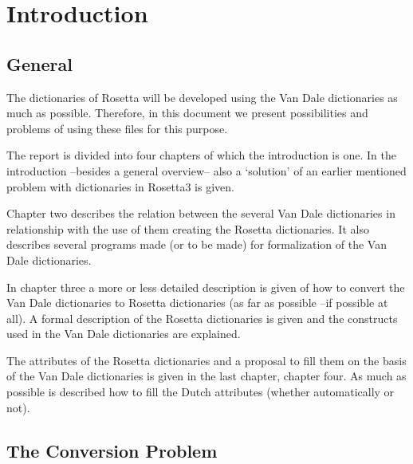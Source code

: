  

   \RosSupersedes{-}
   \MakeRosTitle
%
%
\setlength{\parskip}{2mm}
\setlength{\parindent}{0mm}
 
\section{Introduction}
 
\subsection{General}
 
The dictionaries of Rosetta will be developed using the Van Dale dictionaries 
as much as possible. Therefore, in this document we present 
possibilities and problems of using
these files for this purpose. 
 
The report is divided into four chapters of which the introduction is one.
In the introduction --besides a general overview-- also a `solution' of an 
earlier mentioned problem with dictionaries in Rosetta3 is given.
 
Chapter two describes the relation between the several Van Dale dictionaries
in relationship with the use of them creating the Rosetta dictionaries. It also
describes several programs made (or to be made) for formalization of the Van 
Dale dictionaries.
 
In chapter three a more or less detailed description is given of how to convert 
the Van Dale dictionaries to Rosetta dictionaries (as far as possible --if
possible at all). A formal description of the Rosetta dictionaries is given and 
the constructs used in the Van Dale dictionaries are explained.
 
The attributes of the Rosetta dictionaries and a proposal to fill them on the 
basis of the Van Dale dictionaries is given in the last chapter, chapter four. 
As much as possible is described how to fill the Dutch attributes (whether 
automatically or not).
 
\subsection{The Conversion Problem}
 
